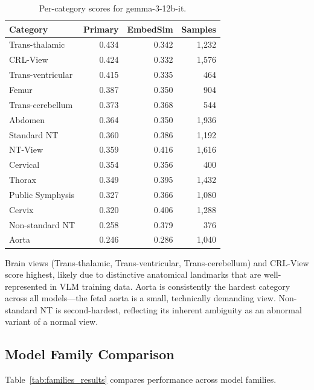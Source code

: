 \documentclass[11pt,a4paper]{article}
\begin{document}
\begin{table}[H]
\centering
\caption{Per-category scores for gemma-3-12b-it.}
\label{tab:percategory}
\begin{tabular}{lrrr}
\toprule
\textbf{Category} & \textbf{Primary} & \textbf{EmbedSim} & \textbf{Samples} \\
\midrule
Trans-thalamic & 0.434 & 0.342 & 1,232 \\
CRL-View & 0.424 & 0.332 & 1,576 \\
Trans-ventricular & 0.415 & 0.335 & 464 \\
Femur & 0.387 & 0.350 & 904 \\
Trans-cerebellum & 0.373 & 0.368 & 544 \\
Abdomen & 0.364 & 0.350 & 1,936 \\
Standard NT & 0.360 & 0.386 & 1,192 \\
NT-View & 0.359 & 0.416 & 1,616 \\
Cervical & 0.354 & 0.356 & 400 \\
Thorax & 0.349 & 0.395 & 1,432 \\
Public Symphysis & 0.327 & 0.366 & 1,080 \\
Cervix & 0.320 & 0.406 & 1,288 \\
Non-standard NT & 0.258 & 0.379 & 376 \\
Aorta & 0.246 & 0.286 & 1,040 \\
\bottomrule
\end{tabular}
\end{table}

Brain views (Trans-thalamic, Trans-ventricular, Trans-cerebellum) and CRL-View score highest, likely due to distinctive anatomical landmarks that are well-represented in VLM training data. Aorta is consistently the hardest category across all models---the fetal aorta is a small, technically demanding view. Non-standard NT is second-hardest, reflecting its inherent ambiguity as an abnormal variant of a normal view.

\subsection{Model Family Comparison}

Table~\ref{tab:families_results} compares performance across model families.
\end{document}

